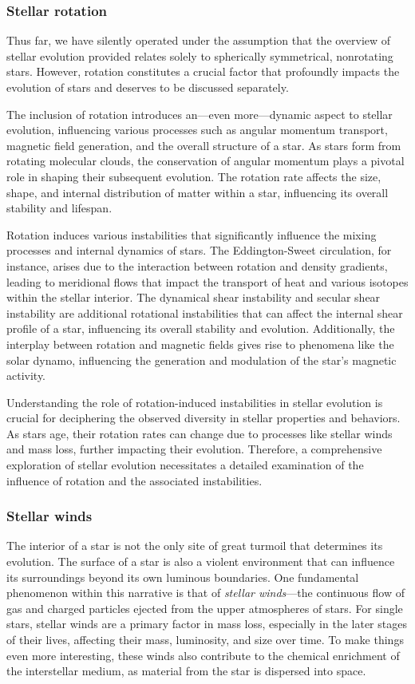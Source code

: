 \documentclass[main.tex]{subfiles}
\begin{document}
    \subsubsection{Stellar rotation}
    Thus far, we have silently operated under the assumption that the overview of stellar evolution provided relates solely to spherically symmetrical, nonrotating stars. However, rotation constitutes a crucial factor that profoundly impacts the evolution of stars and deserves to be discussed separately. 

    The inclusion of rotation introduces an---even more---dynamic aspect to stellar evolution, influencing various processes such as angular momentum transport, magnetic field generation, and the overall structure of a star. As stars form from rotating molecular clouds, the conservation of angular momentum plays a pivotal role in shaping their subsequent evolution. The rotation rate affects the size, shape, and internal distribution of matter within a star, influencing its overall stability and lifespan.

    Rotation induces various instabilities that significantly influence the mixing processes and internal dynamics of stars. The Eddington-Sweet circulation, for instance, arises due to the interaction between rotation and density gradients, leading to meridional flows that impact the transport of heat and various isotopes within the stellar interior. The dynamical shear instability and secular shear instability are additional rotational instabilities that can affect the internal shear profile of a star, influencing its overall stability and evolution. Additionally, the interplay between rotation and magnetic fields gives rise to phenomena like the solar dynamo, influencing the generation and modulation of the star's magnetic activity.

    Understanding the role of rotation-induced instabilities in stellar evolution is crucial for deciphering the observed diversity in stellar properties and behaviors. As stars age, their rotation rates can change due to processes like stellar winds and mass loss, further impacting their evolution. Therefore, a comprehensive exploration of stellar evolution necessitates a detailed examination of the influence of rotation and the associated instabilities.

    \subsubsection{Stellar winds}
    The interior of a star is not the only site of great turmoil that determines its evolution. The surface of a star is also a violent environment that can influence its surroundings beyond its own luminous boundaries. One fundamental phenomenon within this narrative is that of \textit{stellar winds}---the continuous flow of gas and charged particles ejected from the upper atmospheres of stars. For single stars, stellar winds are a primary factor in mass loss, especially in the later stages of their lives, affecting their mass, luminosity, and size over time. To make things even more interesting, these winds also contribute to the chemical enrichment of the interstellar medium, as material from the star is dispersed into space.
\end{document}
